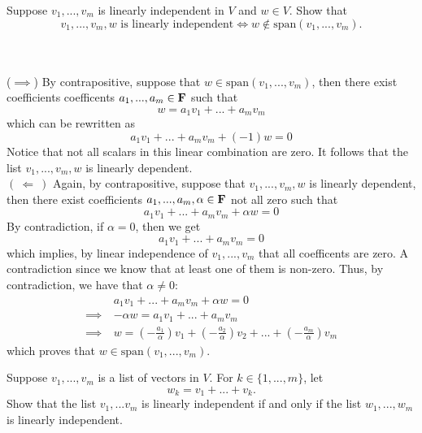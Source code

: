 \begin{exercise}
    Suppose $v_1, ..., v_m$ is linearly independent in $V$ and $w \in V$. Show that
    $$v_1,...,v_m,w \text{ is linearly independent} \iff w \notin \text{span}(v_1, ..., v_m).$$ \\
\end{exercise}

\begin{solution}
    \\ ($\implies$) By contrapositive, suppose that $w \in \text{span}(v_1, ..., v_m)$, then there exist coefficients coefficents $a_1, ..., a_m \in \mathbf{F}$ such that
    $$w = a_1 v_1 + ... + a_m v_m$$
    which can be rewritten as
    $$a_1 v_1 + ... + a_m v_m + (-1)w = 0$$
    Notice that not all scalars in this linear combination are zero. It follows that the list $v_1, ..., v_m, w$ is linearly dependent. \\

    \noindent $( \ \Longleftarrow \ )$ Again, by contrapositive, suppose that $v_1, ..., v_m, w$ is linearly dependent, then there exist coefficients $a_1, ..., a_m, \alpha \in \mathbf{F}$ not all zero such that
    $$a_1 v_1 + ... + a_m v_m + \alpha w = 0$$
    By contradiction, if $\alpha = 0$, then we get  
    $$a_1 v_1 + ... + a_m v_m = 0$$
    which implies, by linear independence of $v_1, ..., v_m$ that all coefficents are zero. A contradiction since we know that at least one of them is non-zero. Thus, by contradiction, we have that $\alpha \neq 0$:
    \begin{align*}
        & a_1 v_1 + ... + a_m v_m + \alpha w = 0 \\
        \implies \ & -\alpha w = a_1 v_1 + ... + a_m v_m \\
        \implies \ & w = \left(-\frac{a_1}{\alpha}\right)v_1 + \left(-\frac{a_2}{\alpha}\right)v_2 + ... + \left(-\frac{a_m}{\alpha}\right)v_m 
    \end{align*}
    which proves that $w \in \text{span}(v_1, ..., v_m)$. \\
\end{solution}

\begin{exercise}
    Suppose $v_1, ..., v_m$ is a list of vectors in $V$. For $k \in \{1, ..., m\}$, let
    $$w_k = v_1 + ... + v_k.$$
    Show that the list $v_1, ... v_m$ is linearly independent if and only if the list $w_1, ..., w_m$ is linearly independent. \\
\end{exercise}

